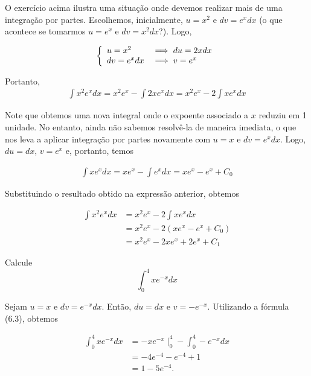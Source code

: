	\begin{resol}
		O exercício acima ilustra uma situação onde devemos realizar mais de uma integração por partes. Escolhemos, inicialmente, $u = x^2$ e $dv = e^xdx$ (o que acontece se tomarmos $u = e^x$ e $dv = x^2dx$?). Logo, 
		
		\begin{displaymath}
			\left\{ \begin{array}{ll}
				u = x^2 & \implies \textrm{$du = 2xdx$}\\
				dv = e^xdx & \implies \textrm{$ v = e^x$}
			\end{array} \right.
		\end{displaymath}
		
		Portanto,	 
		\[\begin{split}
			\int x^2e^xdx = x^2e^x - \int2xe^xdx = x^2e^x - 2\int xe^xdx 
		\end{split}\]
		
		Note que obtemos uma nova integral onde o expoente associado a $x$ reduziu em 1 unidade. No entanto, ainda não sabemos resolvê-la de maneira imediata, o que nos leva a aplicar integração por partes novamente com $u = x$ e $dv = e^xdx$. Logo, $du = dx$, $v = e^x$ e, portanto, temos 
		
		\[\begin{split}
			\int xe^xdx = xe^x - \int e^xdx =  xe^x - e^x + C_0
		\end{split}\]  
		
		Substituindo o resultado obtido na expressão anterior, obtemos 
		
		\[\begin{split}
			\int x^2e^xdx &= x^2e^x - 2\int xe^xdx  \\
			& = x^2e^x - 2(xe^x - e^x + C_0) \\
			& = x^2e^x - 2xe^x + 2e^x + C_1
		\end{split}\]
		
	\end{resol}
	
	\begin{exeresol}
		Calcule $$\int_{0}^{4}xe^{-x}dx$$
	\end{exeresol}
	
	\begin{resol}
		Sejam $u = x$ e $dv = e^{-x}dx$. Então, $du = dx$ e $v =-e^{-x}$. Utilizando a fórmula (6.3), obtemos 
		
		\[\begin{split}
			\int_{0}^{4}xe^{-x}dx & = -xe^{-x}\mid_{0}^{4} - \int_{0}^{4}-e^{-x}dx \\
			& = -4e^{-4} - e^{-4} + 1 \\
			& = 1 - 5e^{-4}.
		\end{split}\]
	\end{resol}
	
